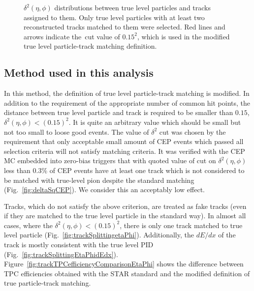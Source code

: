 \begin{figure}[h!]
{	}%
	\caption[$\delta^{2}\left(\eta,\phi\right)$ distributions between true level particles and tracks assigned to them.]{$\delta^{2}\left(\eta,\phi\right)$ distributions between true level particles and tracks assigned to them. Only true level particles with at least two reconstructed tracks matched to them were selected. Red lines and arrows indicate  the~cut value of $0.15^2$, which is used in the modified true level particle-track matching definition.}\label{fig:trackSplittingNominalDelta_2}
\end{figure}




\subsection{Method used in this analysis}\label{subsec:definitionTrueLevelMatching}
In this method, the definition of true level particle-track matching is modified. In addition to the requirement of the appropriate number of common hit points, the distance between true level particle and track is required to be smaller than $0.15$, $\delta^{2}\left(\eta,\phi\right)<\left(0.15\right)^2$. It is quite an arbitrary value which should be small but not too small  to loose good events. The value of $\delta^2$ cut was chosen by the requirement that only acceptable small amount of CEP events which passed all selection criteria will not satisfy matching criteria. It was verified with the CEP MC embedded into zero-bias triggers that with quoted value of cut on $\delta^{2}\left(\eta,\phi\right)$ less than $0.3\%$ of CEP events have at least one track which is not considered to be matched with true-level pion despite the standard matching (Fig.~\ref{fig:deltaSqCEP}). We consider this an acceptably low effect.

Tracks, which do not satisfy the above criterion, are treated as fake tracks (even if they are matched to the true level particle in the standard way). In almost all cases, where the $\delta^{2}\left(\eta,\phi\right)<\left(0.15\right)^2$, there is only one track matched to true level particle (Fig.~\ref{fig:trackSplittingetaPhi}). Additionally, the $dE/dx$ of the track is mostly consistent with the true level PID (Fig.~\ref{fig:trackSplittingEtaPhidEdx}). Figure~\ref{fig:trackTPCefficiencyComparisonEtaPhi} shows the difference between TPC efficiencies obtained with the STAR standard and the modified definition of true particle-track matching.


